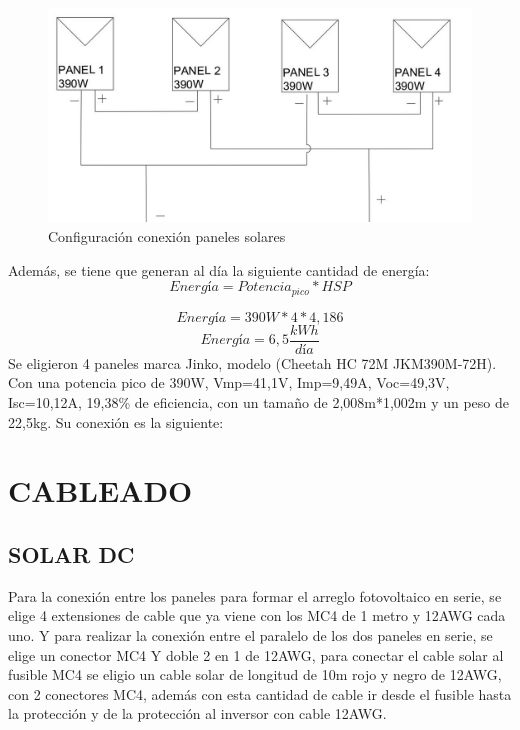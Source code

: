 \documentclass[journal]{IEEEtran}
\begin{document}
\begin{figure}[H]
    \centering
    \includegraphics[scale=0.4]{arrayPV.JPG}
    \caption{Configuración conexión paneles solares}
    \label{curva}
\end{figure}

Además, se tiene que generan al día la siguiente cantidad de energía:
\begin{equation*}
   Energía=Potencia_{pico}*{HSP}
\end{equation*}

\begin{equation*}
   Energía=390W*4*{4,186}
\end{equation*}
\begin{equation*}
   Energía=6,5 \dfrac{kWh}{día}
\end{equation*}
Se eligieron 4 paneles marca Jinko, modelo (Cheetah HC 72M JKM390M-72H). 
Con una potencia pico de 390W, Vmp=41,1V, Imp=9,49A, Voc=49,3V, Isc=10,12A, 19,38\% de eficiencia, con un tamaño de 2,008m*1,002m 
y un peso de 22,5kg. Su conexión es la siguiente:\\

\section*{CABLEADO}

\subsection*{SOLAR DC}

Para la conexión entre los paneles para formar el arreglo fotovoltaico en serie, se elige 4 extensiones de cable que ya viene con los MC4 de 1 metro y 12AWG cada uno. Y para realizar la conexión entre el paralelo de los dos paneles en serie, se elige un conector MC4 Y doble 2 en 1 de 12AWG, para conectar el cable solar al fusible MC4 se eligio un cable solar de longitud de 10m rojo y negro de 12AWG, con 2 conectores MC4, además con esta cantidad de cable ir desde el fusible hasta la protección y de la protección al inversor con cable 12AWG. 
\end{document}
